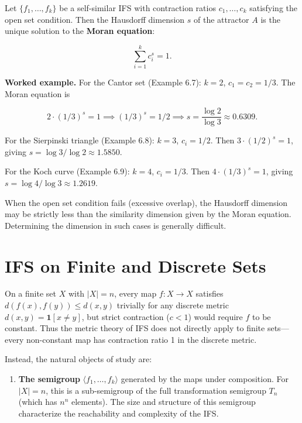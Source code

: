 \begin{theorem}
Let $\{ f_1, \ldots, f_k\} $ be a self-similar IFS with contraction ratios $c_1, \ldots, c_k$ satisfying the open set condition. Then the Hausdorff dimension $s$ of the attractor $A$ is the unique solution to the \textbf{Moran equation}:

\[\sum_{i=1}^{k} c_i^s = 1.\]

\textbf{Worked example.} For the Cantor set (Example 6.7): $k = 2$, $c_1 = c_2 = 1/3$. The Moran equation is

\[2 \cdot (1/3)^s = 1 \implies (1/3)^s = 1/2 \implies s = \frac{\log 2}{\log 3} \approx 0.6309.\]

For the Sierpinski triangle (Example 6.8): $k = 3$, $c_i = 1/2$. Then $3 \cdot (1/2)^s = 1$, giving $s = \log 3 / \log 2 \approx 1.5850$.

For the Koch curve (Example 6.9): $k = 4$, $c_i = 1/3$. Then $4 \cdot (1/3)^s = 1$, giving $s = \log 4 / \log 3 \approx 1.2619$.

When the open set condition fails (excessive overlap), the Hausdorff dimension may be strictly less than the similarity dimension given by the Moran equation. Determining the dimension in such cases is generally difficult.
\end{theorem}

\section{IFS on Finite and Discrete Sets}

On a finite set $X$ with $|X| = n$, every map $f : X \to X$ satisfies $d(f(x), f(y)) \le d(x, y)$ trivially for any discrete metric $d(x, y) = \mathbf{1}[x \ne y]$, but strict contraction ($c < 1$) would require $f$ to be constant. Thus the metric theory of IFS does not directly apply to finite sets—every non-constant map has contraction ratio 1 in the discrete metric.

Instead, the natural objects of study are:

\begin{enumerate}
\item \textbf{The semigroup} $\langle f_1, \ldots, f_k \rangle$ generated by the maps under composition. For $|X| = n$, this is a sub-semigroup of the full transformation semigroup $T_n$ (which has $n^n$ elements). The size and structure of this semigroup characterize the reachability and complexity of the IFS.
\end{enumerate}


